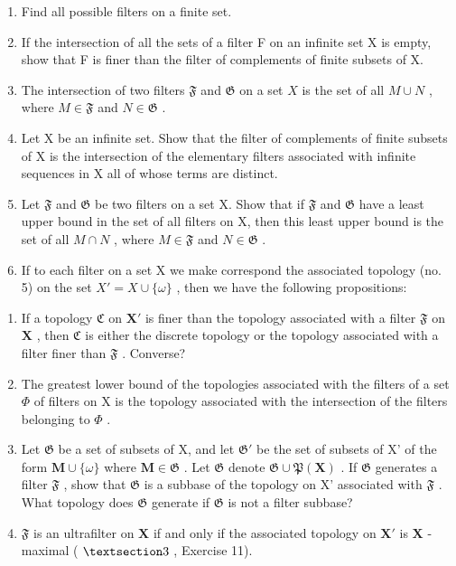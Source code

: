 \BourbakiExerciseGroup

\begin{enumerate}
\def\labelenumi{\arabic{enumi})}
\item
  Find all possible filters on a finite set.
\item
  If the intersection of all the sets of a filter F on an infinite set X is empty, show that F is finer than the filter of complements of finite subsets of X.
\item
  The intersection of two filters \(\mathfrak{F}\) and \(\mathfrak{G}\) on a set \(X\) is the set of all \(M \cup N\) , where \(M \in \mathfrak{F}\) and \(N \in \mathfrak{G}\) .
\item
  Let X be an infinite set. Show that the filter of complements of finite subsets of X is the intersection of the elementary filters associated with infinite sequences in X all of whose terms are distinct.
\item
  Let \(\mathfrak{F}\) and \(\mathfrak{G}\) be two filters on a set X. Show that if \(\mathfrak{F}\) and \(\mathfrak{G}\) have a least upper bound in the set of all filters on X, then this least upper bound is the set of all \(M \cap N\) , where \(M \in \mathfrak{F}\) and \(N \in \mathfrak{G}\) .
\item
  If to each filter on a set X we make correspond the associated topology (no. 5) on the set \(X' = X \cup \{\omega\}\) , then we have the following propositions:
\end{enumerate}

\begin{enumerate}
\def\labelenumi{\alph{enumi})}
\item
  If a topology \(\mathfrak{C}\) on \(\mathbf{X}'\) is finer than the topology associated with a filter \(\mathfrak{F}\) on \(\mathbf{X}\) , then \(\mathfrak{C}\) is either the discrete topology or the topology associated with a filter finer than \(\mathfrak{F}\) . Converse?
\item
  The greatest lower bound of the topologies associated with the filters of a set \(\Phi\) of filters on X is the topology associated with the intersection of the filters belonging to \(\Phi\) .
\item
  Let \(\mathfrak{G}\) be a set of subsets of X, and let \(\mathfrak{G}'\) be the set of subsets of X' of the form \(\mathbf{M} \cup \{\omega\}\) where \(\mathbf{M} \in \mathfrak{G}\) . Let \(\mathfrak{G}\) denote \(\mathfrak{G} \cup \mathfrak{P}(\mathbf{X})\) . If \(\mathfrak{G}\) generates a filter \(\mathfrak{F}\) , show that \(\mathfrak{G}\) is a subbase of the topology on X' associated with \(\mathfrak{F}\) . What topology does \(\mathfrak{G}\) generate if \(\mathfrak{G}\) is not a filter subbase?
\item
  \(\mathfrak{F}\) is an ultrafilter on \(\mathbf{X}\) if and only if the associated topology on \(\mathbf{X}'\) is \(\mathbf{X}\) -maximal ( \(\S 3\) , Exercise 11).
\end{enumerate}

